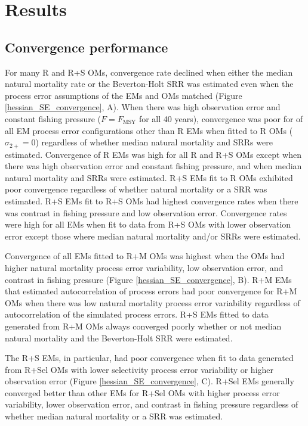 \documentclass[
  12pt,
]{article}
\begin{document}
\hypertarget{results}{%
\section*{Results}\label{results}}

\hypertarget{convergence-performance}{%
\subsection*{Convergence performance}\label{convergence-performance}}

For many R and R+S OMs, convergence rate declined when either the median
natural mortality rate or the Beverton-Holt SRR was estimated even when
the process error assumptions of the EMs and OMs matched (Figure
\ref{hessian_SE_convergence}, A). When there was high observation error
and constant fishing pressure (\(F = F_{\text{MSY}}\) for all 40 years),
convergence was poor for of all EM process error configurations other
than R EMs when fitted to R OMs (\(\sigma_{2+} = 0\)) regardless of
whether median natural mortality and SRRs were estimated. Convergence of
R EMs was high for all R and R+S OMs except when there was high
observation error and constant fishing pressure, and when median natural
mortality and SRRs were estimated. R+S EMs fit to R OMs exhibited poor
convergence regardless of whether natural mortality or a SRR was
estimated. R+S EMs fit to R+S OMs had highest convergence rates when
there was contrast in fishing pressure and low observation error.
Convergence rates were high for all EMs when fit to data from R+S OMs
with lower observation error except those where median natural mortality
and/or SRRs were estimated.

Convergence of all EMs fitted to R+M OMs was highest when the OMs had
higher natural mortality process error variability, low observation
error, and contrast in fishing pressure (Figure
\ref{hessian_SE_convergence}, B). R+M EMs that estimated autocorrelation
of process errors had poor convergence for R+M OMs when there was low
natural mortality process error variability regardless of
autocorrelation of the simulated process errors. R+S EMs fitted to data
generated from R+M OMs always converged poorly whether or not median
natural mortality and the Beverton-Holt SRR were estimated.

The R+S EMs, in particular, had poor convergence when fit to data
generated from R+Sel OMs with lower selectivity process error
variability or higher observation error (Figure
\ref{hessian_SE_convergence}, C). R+Sel EMs generally converged better
than other EMs for R+Sel OMs with higher process error variability,
lower observation error, and contrast in fishing pressure regardless of
whether median natural mortality or a SRR was estimated.
\end{document}
